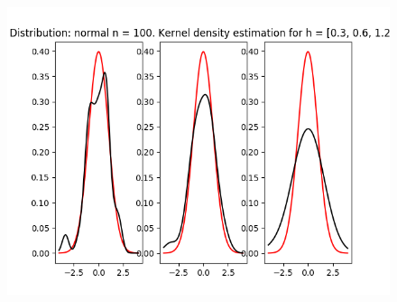 \documentclass[12pt]{article}
\begin{document}
\begin{center}
\begin{figure}[H]
\includegraphics[width=\textwidth]{kernel/d_normal100.png}
\end{figure}


\end{center}
\end{document}
